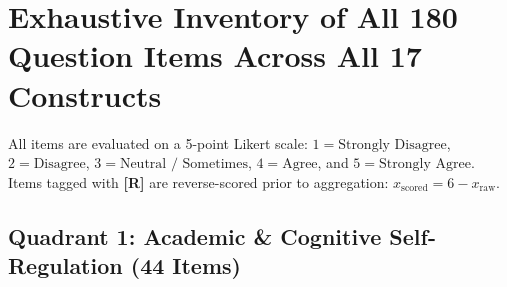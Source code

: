 \documentclass[10pt,a4paper]{article}
\begin{document}
\section{Exhaustive Inventory of All 180 Question Items Across All 17 Constructs}

All items are evaluated on a 5-point Likert scale: $1 = \text{Strongly Disagree}$, $2 = \text{Disagree}$, $3 = \text{Neutral / Sometimes}$, $4 = \text{Agree}$, and $5 = \text{Strongly Agree}$. Items tagged with \textbf{[R]} are reverse-scored prior to aggregation: $x_{\text{scored}} = 6 - x_{\text{raw}}$.

\subsection{Quadrant 1: Academic \& Cognitive Self-Regulation (44 Items)}
\end{document}
